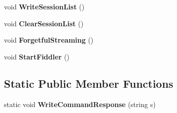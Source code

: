 \begin{DoxyCompactItemize}
\item 
\hypertarget{class_proto_test_1_1_golem_1_1_proxy_1_1_fiddler_proxy_a5a7c15ff723c1717f19c487a3b96cdc4}{void {\bfseries Write\-Session\-List} ()}\label{class_proto_test_1_1_golem_1_1_proxy_1_1_fiddler_proxy_a5a7c15ff723c1717f19c487a3b96cdc4}

\item 
\hypertarget{class_proto_test_1_1_golem_1_1_proxy_1_1_fiddler_proxy_af909a7d423d3afd6ba7f559329135f3b}{void {\bfseries Clear\-Session\-List} ()}\label{class_proto_test_1_1_golem_1_1_proxy_1_1_fiddler_proxy_af909a7d423d3afd6ba7f559329135f3b}

\item 
\hypertarget{class_proto_test_1_1_golem_1_1_proxy_1_1_fiddler_proxy_aa18145988f5ede9cac3b25c97e14e71e}{void {\bfseries Forgetful\-Streaming} ()}\label{class_proto_test_1_1_golem_1_1_proxy_1_1_fiddler_proxy_aa18145988f5ede9cac3b25c97e14e71e}

\item 
\hypertarget{class_proto_test_1_1_golem_1_1_proxy_1_1_fiddler_proxy_a87495cefee1784c9cd860420fa1a04a8}{void {\bfseries Start\-Fiddler} ()}\label{class_proto_test_1_1_golem_1_1_proxy_1_1_fiddler_proxy_a87495cefee1784c9cd860420fa1a04a8}

\end{DoxyCompactItemize}
\subsection*{Static Public Member Functions}
\begin{DoxyCompactItemize}
\item 
\hypertarget{class_proto_test_1_1_golem_1_1_proxy_1_1_fiddler_proxy_add131e391a1204d601f4fa2ad007f7ff}{static void {\bfseries Write\-Command\-Response} (string s)}\label{class_proto_test_1_1_golem_1_1_proxy_1_1_fiddler_proxy_add131e391a1204d601f4fa2ad007f7ff}

\end{DoxyCompactItemize}
